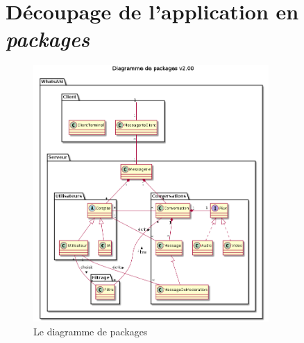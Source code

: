 \documentclass[11pt,dvipsnames,svgnames]{report}
\begin{document}
\section{Découpage de l'application en \emph{packages}}
\begin{figure}[H]
\centerline{\includegraphics[width=0.8\textwidth]{diagrammes/package-diag.png}}
\caption{Le diagramme de packages}
\end{figure}
\end{document}
